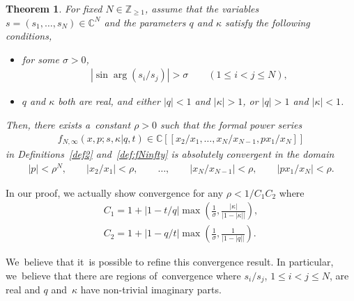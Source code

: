 \documentclass[pdftex]{sigma}%
\numberwithin{equation}{section}
\newtheorem{Theorem}{Theorem}[section]
\newcommand{\C}{{\mathbb C}}
\newcommand{\Z}{{\mathbb Z}}
\begin{document}
\begin{Theorem}\label{thm:converegence}
For fixed $N\in\Z_{\geq 1}$, assume that the variables $s=(s_1,\dots,s_N)\in\C^N$ and the parameters $q$ and $\kappa$ satisfy the following conditions,
\begin{itemize}\itemsep=0pt
\item[$(i)$] for some $\sigma>0$,
\begin{gather*}
{}|\sin\arg(s_i/s_j)|>\sigma \qquad (1\leq i<j\leq N),
\end{gather*}
\item[$(ii)$] $q$ and $\kappa$ both are real, and either $|q|<1$ and $|\kappa|>1$, or $|q|>1$ and $|\kappa|<1$.
\end{itemize}
Then, there exists a~constant $\rho>0$ such that the formal power series
\begin{gather*}
f_{N,\infty}(x,p;s,\kappa|q,t)\in \C[[x_2/x_1,\dots,x_N/x_{N-1},px_1/x_N]]
\end{gather*}
in Definitions~{\rm \ref{def2}} and~{\rm \ref{def:fNinfty}} is absolutely convergent in the domain
\begin{gather}\label{xcond}
|p|<\rho^N,\qquad |x_2/x_1|<\rho,\qquad \dots,\qquad |x_N/x_{N-1}|<\rho,\qquad |px_1/x_N|<\rho.
\end{gather}
\end{Theorem}
\begin{Remark}In our proof, we actually show convergence for any $\rho<1/C_1C_2$ where
\begin{gather}
C_1= 1+|1-t/q|\max\left(\frac1{\sigma}, \frac{|\kappa|}{|1-|\kappa||}\right)\!,\nonumber\\
C_2= 1+|1-q/t|\max\left(\frac1{\sigma},\frac{1}{|1-|q||}\right)\!.\label{C1C2}
\end{gather}
\end{Remark}
\begin{Remark}
We~believe that it~is possible to refine this convergence result. In particular, we~believe that there are regions of~convergence where $s_i/s_j$, $1\leq i<j\leq N$, are real and $q$ and~$\kappa$ have non-trivial imaginary parts.
\end{Remark}
\end{document}
